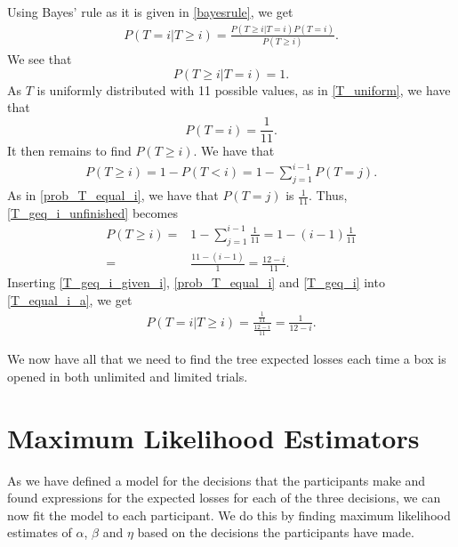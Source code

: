 Using Bayes' rule as it is given in \eqref{bayesrule}, we get
\begin{equation}
\label{T_equal_i_a}
    \begin{aligned}
        P(T=i|T\geq i) = \frac{P(T\geq i|T=i)P(T=i)}{P(T\geq i)}.
    \end{aligned}
\end{equation}
We see that 
\begin{equation}
\label{T_geq_i_given_i}
    P(T\geq i|T=i) = 1.
\end{equation}
As $T$ is uniformly distributed with 11 possible values, as in \eqref{T_uniform}, we have that
\begin{equation}
\label{prob_T_equal_i}
    P(T=i) = \frac{1}{11}.
\end{equation}
It then remains to find $P(T\geq i)$. We have that
\begin{equation}
\label{T_geq_i_unfinished}
    \begin{aligned}
        P(T\geq i) = 1 - P(T<i) = 1 - \sum_{j=1}^{i-1}P(T=j).
    \end{aligned}
\end{equation}
As in \eqref{prob_T_equal_i}, we have that $P(T=j)$ is $\frac{1}{11}$. Thus, \eqref{T_geq_i_unfinished} becomes
\begin{equation}
\label{T_geq_i}
    \begin{aligned}
        P(T\geq i) =& 1-\sum_{j=1}^{i-1} \frac{1}{11} = 1- (i-1)\frac{1}{11}\\[6pt]
        =& \frac{11-(i-1)}{1} = \frac{12-i}{11}.
    \end{aligned}
\end{equation}
Inserting \eqref{T_geq_i_given_i}, \eqref{prob_T_equal_i} and \eqref{T_geq_i} into \eqref{T_equal_i_a}, we get 
\begin{equation}
    \begin{aligned}
        P(T=i|T\geq i) = \frac{\frac{1}{11}}{\frac{12-i}{11}} = \frac{1}{12-i}.
    \end{aligned}
\end{equation}

We now have all that we need to find the tree expected losses each time a box is opened in both unlimited and limited trials. 





\section{Maximum Likelihood Estimators}
\label{section:mles}
As we have defined a model for the decisions that the participants make and found expressions for the expected losses for each of the three decisions, we can now fit the model to each participant. We do this by finding maximum likelihood estimates of $\alpha$, $\beta$ and $\eta$ based on the decisions the participants have made.

